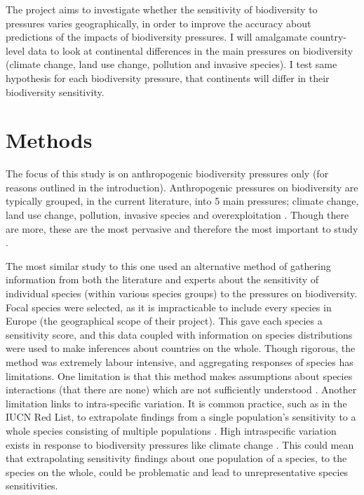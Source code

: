\documentclass[11pt, a4paper, titlepage]{article}
\begin{document}
 	The project aims to investigate whether the sensitivity of biodiversity to pressures varies geographically, in order to improve the accuracy about predictions of the impacts of biodiversity pressures. I will amalgamate country-level data to look at continental differences in the main pressures on biodiversity (climate change, land use change, pollution and invasive species). I test same hypothesis for each biodiversity pressure, that continents will differ in their biodiversity sensitivity.  \newpage
 	
    \section*{Methods}

	The focus of this study is on anthropogenic biodiversity pressures only (for reasons outlined in the introduction). Anthropogenic pressures on biodiversity are typically grouped, in the current literature, into 5 main pressures; climate change, land use change, pollution, invasive species and overexploitation \citep{watson2019summary}. Though there are more, these are the most pervasive and therefore the most important to study \citep{mazor2018global}. 
	
	The most similar study to this one \citep{louette2010bioscore} used an alternative method of gathering information from both the literature and experts about the sensitivity of individual species (within various species groups) to the pressures on biodiversity. Focal species were selected, as it is impracticable to include every species in Europe (the geographical scope of their project). This gave each species a sensitivity score, and this data coupled with information on species distributions were used to make inferences about countries on the whole. 
	Though rigorous, the \cite{louette2010bioscore} method was extremely labour intensive, and aggregating responses of species has limitations. One limitation is that this method makes assumptions about species interactions (that there are none) which are not sufficiently understood \citep{hansen2001global}. Another limitation links to intra-specific variation. It is common practice, such as in the IUCN Red List, to extrapolate findings from a single population's sensitivity to a whole species consisting of multiple populations \citep{iucn2001iucn} \citep{buckley2012functional}. High intraspecific variation exists in response to biodiversity pressures like climate change \citep{mclean2018high} \citep{both2004large} \citep{mayor2016assessing}. This could mean that extrapolating sensitivity findings about one population of a species, to the species on the whole, could be problematic and lead to unrepresentative species sensitivities.
	
\end{document}
